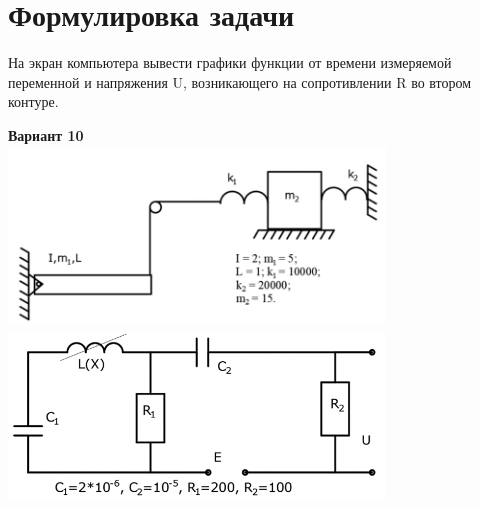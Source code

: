 \documentclass[a4paper,14pt]{extarticle}
\begin{document}
\section{Формулировка задачи}
На экран компьютера вывести графики функции от времени измеряемой переменной и напряжения U, возникающего на сопротивлении R во втором контуре.\bigbreak
\begin{center}
\textbf{Вариант 10}\\
\includegraphics[width=100mm]{task1}
\includegraphics[width=100mm]{task2}
\end{center}
\end{document}
